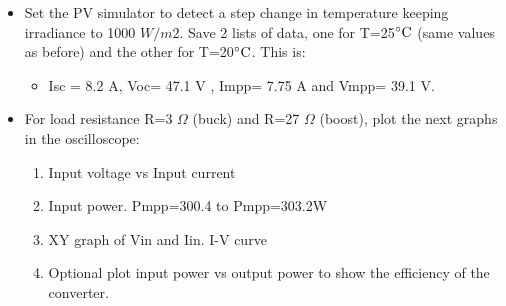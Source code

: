 \begin{itemize}
  \item Set the PV simulator to detect a step change in temperature keeping irradiance to 1000 $W /m2$.
  Save 2 lists of data, one for T=25$\decC$ (same values as before) and the other for T=20$\decC$. This is:
  \begin{itemize}
  	\item Isc = 8.2 A, Voc= 47.1 V , Impp= 7.75 A and Vmpp= 39.1 V.
  \end{itemize} 

  \item For load resistance R=3 $\Omega$ (buck) and R=27 $\Omega$ (boost), plot the next graphs in the oscilloscope:
  \begin{enumerate}
  	\item Input voltage vs Input current 
  	\item Input power. Pmpp=300.4 to  Pmpp=303.2W
  	\item XY graph of Vin and Iin. I-V curve
  	\item Optional plot input power vs output power to show the efficiency of the converter.
  \end{enumerate}
  
  
\end{itemize}
	
